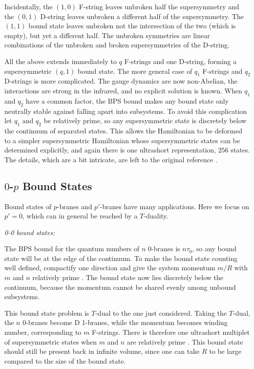 \documentclass[12pt]{article}
\begin{document}
Incidentally, the $(1,0)$ F-string leaves unbroken half the supersymmetry and
the $(0,1)$ D-string leaves unbroken a different half of the supersymmetry. 
The $(1,1)$ bound state leaves unbroken not the intersection of the two
(which is empty), but yet a different half.  The unbroken symmetries are
linear combinations of the unbroken and broken supersymmetries of the
D-string.

All the above extends immediately to $q$ F-strings and one D-string, forming
a supersymmetric $(q,1)$ bound state.  The more general case of $q_1$
F-strings and $q_2$ D-strings is more complicated.  The gauge dynamics are
now non-Abelian, the interactions are strong in the infrared, and no explicit
solution is known.  When $q_1$ and $q_2$ have a common factor, the BPS bound
makes any bound state only neutrally stable against falling apart into
subsystems.  To avoid this complication let $q_1$ and $q_2$ be relatively
prime, so any supersymmetric state is discretely below the continuum of
separated states.  This allows the Hamiltonian to be deformed to a simpler
supersymmetric Hamiltonian whose supersymmetric states can be 
determined explicitly, and again there is one ultrashort
representation, $256$ states.  The details, which are a bit intricate,
are left to the original reference \cite{witbound}.

\subsection{$0$-$p$ Bound States}

Bound states of $p$-branes and $p'$-branes have many applications.  Here we
focus on $p' = 0$, which can in general be reached by a $T$-duality.

{\it 0-0 bound states:} 

The BPS bound for the quantum numbers of $n$ 0-branes
is $n \tau_0$, so any bound state will be at the edge of the continuum.  To
make the bound state counting well defined, compactify one direction and give
the system momentum $m/R$ with $m$ and $n$ relatively prime \cite{senbound}.
The bound state now lies discretely below the continuum, because the momentum
cannot be shared evenly among unbound subsystems.

This bound state problem is $T$-dual to the one just considered.  Taking the
$T$-dual, the $n$ 0-branes become D 1-branes, while the momentum becomes
winding number, corresponding to $m$ F-strings.  There is therefore one
ultrashort multiplet of supersymmetric states when $m$ and $n$ are relatively
prime \cite{senbound}. This bound state should still be present back in infinite
volume, since one can take $R$ to be large compared to the size of the bound
state.
\end{document}
